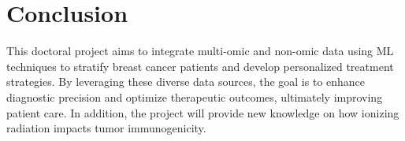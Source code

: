 \documentclass[a4paper, 12pt]{article}
\begin{document}
\section*{Conclusion}
This doctoral project aims to integrate multi-omic and non-omic data using ML techniques to stratify breast cancer patients and develop personalized treatment strategies. By leveraging these diverse data sources, the goal is to enhance diagnostic precision and optimize therapeutic outcomes, ultimately improving patient care.
In addition, the project will provide new knowledge on how ionizing radiation impacts tumor immunogenicity.
\footnotesize
\printbibliography[
    heading=bibintoc, %
    title={References} %
]
\end{document}
